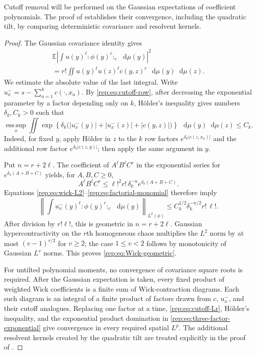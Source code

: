 \documentclass[11pt,reqno]{amsart}
\numberwithin{equation}{section}
\theoremstyle{plain}
\theoremstyle{definition}
\newcommand{\dd}{\mathop{}\!\mathrm d}
\newcommand{\E}{\mathbb E}
\begin{document}
Cutoff removal will be performed on the Gaussian expectations of coefficient polynomials. The proof of  establishes their convergence, including the quadratic tilt, by comparing deterministic covariance and resolvent kernels.

\begin{proof}
The Gaussian covariance identity gives
\begin{multline}\label{rep:eq:wick-L2}
 \E\left|\int u(y)^\ell:\!\phi(y)^r\!:_c\,\dd\mu(y)\right|^2\\
 =r!\iint u(y)^\ell u(z)^\ell c(y,z)^r\,\dd\mu(y)\dd\mu(z).
\end{multline}
We estimate the absolute value of the last integral.  Write
$u_x^-=s-\sum_{a=1}^kc(\cdot,x_a)$.  By \eqref{rep:eq:cutoff-row}, after decreasing the exponential parameter by a factor depending only on $k$, H\"older's inequality gives numbers $\delta_k,C_k>0$ such that
\begin{equation}\label{rep:eq:three-factor-exponential}
 \operatorname*{ess\,sup}_x\iint
 \exp\!\left\{\delta_k\bigl(
 |u_x^-(y)|+|u_x^-(z)|+|c(y,z)|\bigr)\right\}
 \,\dd\mu(y)\dd\mu(z)\le C_k.
\end{equation}
Indeed, for fixed $y$, apply H\"older in $z$ to the $k$ row factors
$e^{\delta_k|c(z,x_a)|}$ and the additional row factor
$e^{\delta_k|c(z,y)|}$; then apply the same argument in $y$.

Put $n=r+2\ell$.  The coefficient of
$A^\ell B^\ell C^r$ in the exponential series for
$e^{\delta_k(A+B+C)}$ yields, for $A,B,C\ge0$,
\begin{equation}\label{rep:eq:factorial-monomial}
 A^\ell B^\ell C^r
 \le \ell!^2r!\,\delta_k^{-n}e^{\delta_k(A+B+C)}.
\end{equation}
Equations \eqref{rep:eq:wick-L2}--\eqref{rep:eq:factorial-monomial} therefore imply
\begin{equation}\label{rep:eq:factorial-bound}
 \left\|\int u_x^-(y)^\ell:\!\phi(y)^r\!:_c\,\dd\mu(y)\right\|_{L^2(\phi)}
 \le C_k^{1/2}\delta_k^{-n/2}r!\,\ell!.
\end{equation}
After division by $r!\ell!$, this is geometric in $n=r+2\ell$.
Gaussian hypercontractivity on the $r$th homogeneous chaos \cite[Proposition~2.6]{NourdinPeccatiReinert2010} multiplies the
$L^2$ norm by at most $(v-1)^{r/2}$ for $v\ge2$; the case $1\le v<2$ follows by monotonicity of Gaussian $L^v$ norms.  This proves \eqref{rep:eq:Wick-geometric}.

For untilted polynomial moments, no convergence of covariance square roots is required.  After the Gaussian expectation is taken, every fixed product of weighted Wick coefficients is a finite sum of Wick-contraction diagrams.  Each such diagram is an integral of a finite product of factors drawn from $c$, $u_x^-$, and their cutoff analogues.  Replacing one factor at a time, \eqref{rep:eq:cutoff-Lr}, H\"older's inequality, and the exponential product domination in \eqref{rep:eq:three-factor-exponential} give convergence in every required spatial $L^p$.  The additional resolvent kernels created by the quadratic tilt are treated explicitly in the proof of .
\end{proof}
\end{document}
